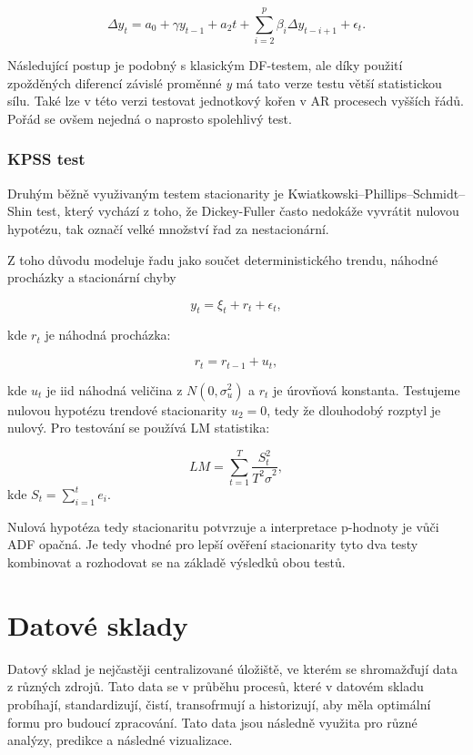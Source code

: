 \documentclass[thesis=M,czech]{FITthesis}[2022/10/08]
\begin{document}
\[\Delta y_t = a_0 + \gamma y_{t-1} + a_2t + \sum_{i=2}^p \beta_i\Delta y_{t-i+1} + \epsilon_t.\] 


Následující postup je podobný s klasickým DF-testem, ale díky použití zpožděných diferencí závislé proměnné \textit{y} má tato verze testu větší statistickou sílu. Také lze v této verzi testovat jednotkový kořen v AR procesech vyšších řádů. Pořád se ovšem nejedná o naprosto spolehlivý test. \cite{pokorny}

\subsection{KPSS test}

Druhým běžně využivaným testem stacionarity je Kwiatkowski–Phillips–Schmidt–Shin test, který vychází z toho, že Dickey-Fuller často nedokáže vyvrátit nulovou hypotézu, tak označí velké množství řad za nestacionární.

Z toho důvodu modeluje řadu jako součet deterministického trendu, náhodné procházky a stacionární chyby 

\[y_t = \xi_t + r_t + \epsilon_t,\] 

kde $r_t$ je náhodná procházka:

\[r_t = r_{t-1} + u_t,\]

kde $u_t$ je iid náhodná veličina z $N(0, \sigma_u^2)$ a $r_t$ je úrovňová konstanta. Testujeme nulovou hypotézu trendové stacionarity $u_2 = 0$, tedy že dlouhodobý rozptyl je nulový. Pro testování se používá LM statistika:

\[LM = \sum_{t=1}^T \frac{S_t^2}{T^2\hat{\sigma}^2},\]
kde $S_t = \sum_{i=1}^t e_i.$

Nulová hypotéza tedy stacionaritu potvrzuje a interpretace p-hodnoty je vůči ADF opačná. Je tedy vhodné pro lepší ověření stacionarity tyto dva testy kombinovat a rozhodovat se na základě výsledků obou testů. \cite{pokorny}

\chapter{Datové sklady}
Datový sklad je nejčastěji centralizované úložiště, ve kterém se shromažďují data z různých zdrojů. Tato data se v průběhu procesů, které v datovém skladu probíhají, standardizují, čistí, transofrmují a historizují, aby měla optimální formu pro budoucí zpracování. Tato data jsou následně využita pro různé analýzy, predikce a následné vizualizace. \cite{EDW2}
\end{document}
